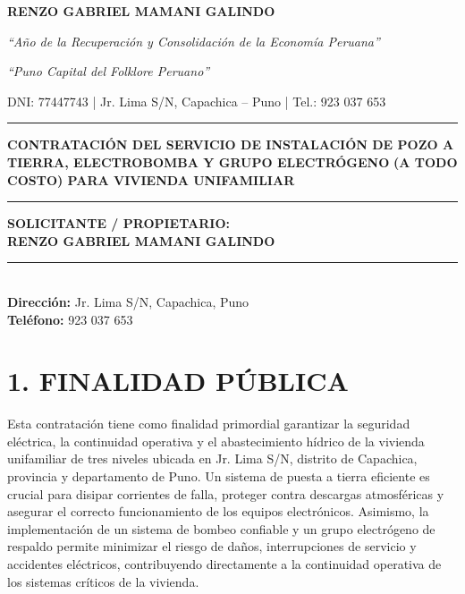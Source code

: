 \documentclass[12pt,a4paper]{article}
\begin{document}
\begin{center}
\vspace*{-1.5cm}
{\large\textbf{RENZO GABRIEL MAMANI GALINDO}}

\vspace{0.1cm}
{\small\textit{``Año de la Recuperación y Consolidación de la Economía Peruana''}}

\vspace{0.1cm}
{\small\textit{``Puno Capital del Folklore Peruano''}}

\vspace{0.1cm}
{\small DNI: 77447743 \quad | \quad Jr. Lima S/N, Capachica -- Puno \quad | \quad Tel.: 923 037 653}

\vspace{0.5cm}
\rule{\textwidth}{1pt}
\vspace{0.3cm}

{\Large\textbf{CONTRATACIÓN DEL SERVICIO DE INSTALACIÓN DE POZO A TIERRA,
ELECTROBOMBA Y GRUPO ELECTRÓGENO}}
{\Large\textbf{(A TODO COSTO) PARA VIVIENDA UNIFAMILIAR}}

\vspace{0.3cm}
\rule{\textwidth}{1pt}

\vspace{0.5cm}
\begin{flushleft}
\large
\textbf{SOLICITANTE / PROPIETARIO:} \\
{\LARGE\bfseries\color{navyblue} RENZO GABRIEL MAMANI GALINDO} \\
\rule{0.4\textwidth}{2pt} \\
\medskip
\large
\textbf{Dirección:} Jr. Lima S/N, Capachica, Puno \\
\textbf{Teléfono:} 923 037 653
\end{flushleft}
\end{center}

\section*{1. FINALIDAD PÚBLICA}

Esta contratación tiene como finalidad primordial garantizar la seguridad eléctrica, la continuidad operativa y el abastecimiento hídrico de la vivienda unifamiliar de tres niveles ubicada en Jr. Lima S/N, distrito de Capachica, provincia y departamento de Puno. Un sistema de puesta a tierra eficiente es crucial para disipar corrientes de falla, proteger contra descargas atmosféricas y asegurar el correcto funcionamiento de los equipos electrónicos. Asimismo, la implementación de un sistema de bombeo confiable y un grupo electrógeno de respaldo permite minimizar el riesgo de daños, interrupciones de servicio y accidentes eléctricos, contribuyendo directamente a la continuidad operativa de los sistemas críticos de la vivienda.
\end{document}
